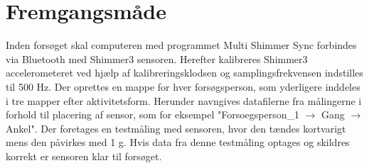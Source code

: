 \section{Fremgangsmåde}
Inden forsøget skal computeren med programmet Multi Shimmer Sync forbindes via Bluetooth med Shimmer3 sensoren. Herefter kalibreres Shimmer3 accelerometeret ved hjælp af kalibreringsklodsen og samplingsfrekvensen indstilles til 500 Hz. %
Der oprettes en mappe for hver forsøgsperson, som yderligere inddeles i tre mapper efter aktivitetsform. Herunder navngives datafilerne fra målingerne i forhold til placering af sensor, som for eksempel "Forsoegsperson\_1 $\rightarrow$ Gang $\rightarrow$ Ankel".
Der foretages en testmåling med sensoren, hvor den tændes kortvarigt mens den påvirkes med 1 g. Hvis data fra denne testmåling optages og skildres korrekt er sensoren klar til forsøget.

